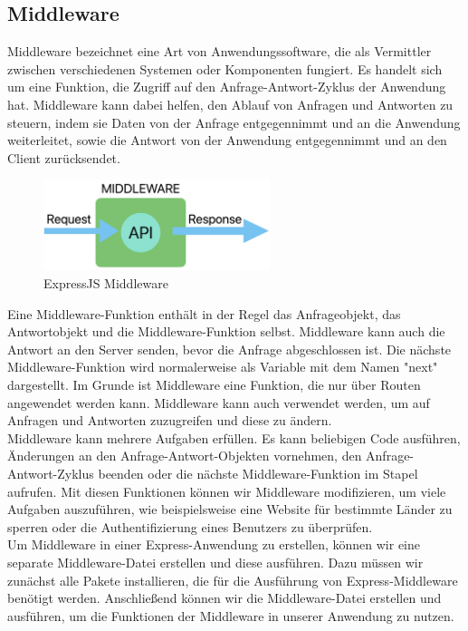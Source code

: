 \subsection{Middleware}\label{appendix:a5}\par
Middleware bezeichnet eine Art von Anwendungssoftware, die als Vermittler zwischen verschiedenen Systemen oder Komponenten fungiert. Es handelt sich um eine Funktion, die Zugriff auf den Anfrage-Antwort-Zyklus der Anwendung hat. Middleware kann dabei helfen, den Ablauf von Anfragen und Antworten zu steuern, indem sie Daten von der Anfrage entgegennimmt und an die Anwendung weiterleitet, sowie die Antwort von der Anwendung entgegennimmt und an den Client zurücksendet.
\\
\begin{figure}[htbp]
	\centering
	\includegraphics[width=250px]{img/ExpressJS_Middleware_1.png}
	\caption{ExpressJS Middleware}
\end{figure}
Eine Middleware-Funktion enthält in der Regel das Anfrageobjekt, das Antwortobjekt und die Middleware-Funktion selbst. Middleware kann auch die Antwort an den Server senden, bevor die Anfrage abgeschlossen ist. Die nächste Middleware-Funktion wird normalerweise als Variable mit dem Namen "next" dargestellt. Im Grunde ist Middleware eine Funktion, die nur über Routen angewendet werden kann. Middleware kann auch verwendet werden, um auf Anfragen und Antworten zuzugreifen und diese zu ändern.
\\
Middleware kann mehrere Aufgaben erfüllen. Es kann beliebigen Code ausführen, Änderungen an den Anfrage-Antwort-Objekten vornehmen, den Anfrage-Antwort-Zyklus beenden oder die nächste Middleware-Funktion im Stapel aufrufen. Mit diesen Funktionen können wir Middleware modifizieren, um viele Aufgaben auszuführen, wie beispielsweise eine Website für bestimmte Länder zu sperren oder die Authentifizierung eines Benutzers zu überprüfen.
\\
Um Middleware in einer Express-Anwendung zu erstellen, können wir eine separate Middleware-Datei erstellen und diese ausführen. Dazu müssen wir zunächst alle Pakete installieren, die für die Ausführung von Express-Middleware benötigt werden. Anschließend können wir die Middleware-Datei erstellen und ausführen, um die Funktionen der Middleware in unserer Anwendung zu nutzen.
